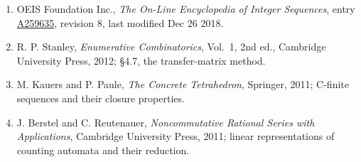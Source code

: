 \documentclass[11pt]{article}
\theoremstyle{definition}
\begin{document}
\begin{enumerate}

\item OEIS Foundation Inc., \emph{The On-Line Encyclopedia of Integer Sequences}, entry \href{https://oeis.org/A259635}{A259635}, revision 8, last modified Dec 26 2018.

\item R. P. Stanley, \emph{Enumerative Combinatorics}, Vol.~1, 2nd ed., Cambridge University Press, 2012; \S4.7, the transfer-matrix method.

\item M. Kauers and P. Paule, \emph{The Concrete Tetrahedron}, Springer, 2011; C-finite sequences and their closure properties.

\item J. Berstel and C. Reutenauer, \emph{Noncommutative Rational Series with Applications}, Cambridge University Press, 2011; linear representations of counting automata and their reduction.

\end{enumerate}
\end{document}
